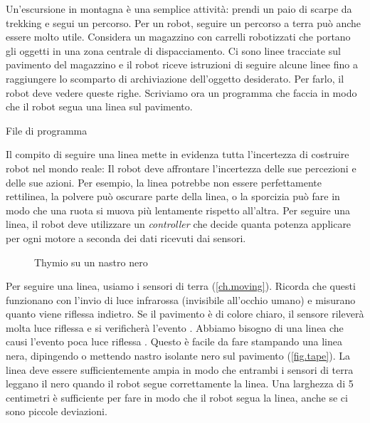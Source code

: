 
\label{ch.line}

Un'escursione in montagna è una semplice attività:
prendi un paio di scarpe da trekking e segui un percorso.
Per un robot, seguire un percorso a terra può anche essere molto utile.
Considera un magazzino con carrelli robotizzati che portano gli oggetti in una zona centrale di dispacciamento.
Ci sono linee tracciate sul pavimento del magazzino e il robot riceve istruzioni di seguire
alcune linee fino a raggiungere lo scomparto di archiviazione dell'oggetto desiderato.
Per farlo, il robot deve vedere queste righe.
Scriviamo ora un programma che faccia in modo che il robot segua una linea sul pavimento.

{\raggedleft \hfill File di programma }

Il compito di seguire una linea mette in evidenza tutta l'incertezza di costruire
robot nel mondo reale: Il robot deve affrontare l'incertezza delle sue percezioni
e delle sue azioni.
Per esempio, la linea potrebbe non essere perfettamente rettilinea, la polvere può oscurare parte della linea, o la sporcizia può fare in modo che una ruota si muova più lentamente rispetto all'altra.
Per seguire una linea, il robot deve utilizzare un
\emph{controller} che decide quanta potenza applicare per ogni motore
a seconda dei dati ricevuti dai sensori.


\begin{figure}
	\hfill
	\caption{Thymio su un nastro nero}
\end{figure}

Per seguire una linea, usiamo i sensori di terra (\cref{ch.moving}).
Ricorda che questi funzionano con l'invio di luce infrarossa (invisibile all'occhio umano) e misurano quanto viene riflessa indietro.
Se il pavimento è di colore chiaro, il sensore rileverà molta luce riflessa
e si verificherà  l'evento . Abbiamo bisogno di una linea
che causi l'evento poca luce riflessa
. Questo è facile da fare stampando una linea nera, dipingendo o mettendo nastro isolante nero sul pavimento (\cref{fig.tape}). La linea deve
essere sufficientemente ampia in modo che entrambi i sensori di terra leggano il nero quando il
robot segue correttamente la linea. Una larghezza di 5
centimetri è sufficiente per fare in modo che il robot segua la linea, anche se ci
sono piccole deviazioni.

